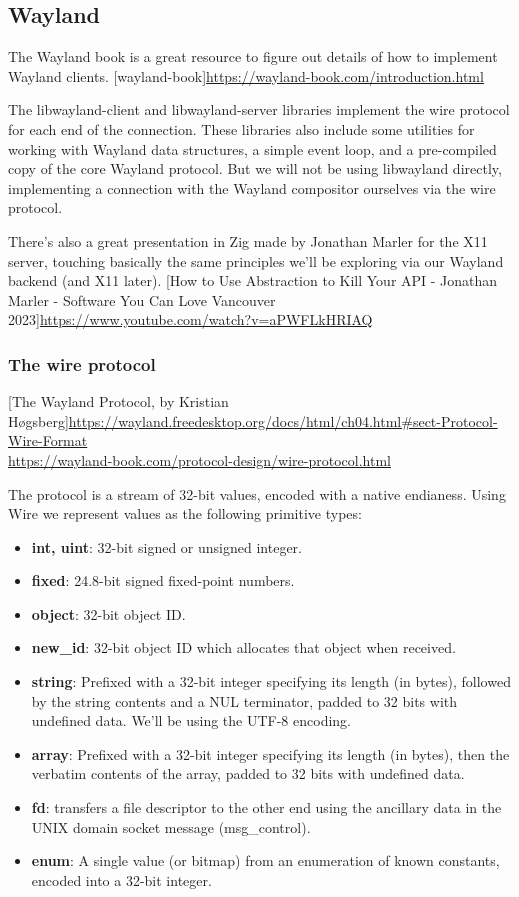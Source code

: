 \subsection{Wayland}
The Wayland book is a great resource to figure out details of how to implement Wayland clients.
[wayland-book]\url{https://wayland-book.com/introduction.html}

The libwayland-client and libwayland-server libraries implement the wire protocol for each end of the connection.
These libraries also include some utilities for working with Wayland data structures, a simple event loop, and a pre-compiled copy of the core Wayland protocol.
But we will not be using libwayland directly, implementing a connection with the Wayland compositor ourselves via the wire protocol.

There's also a great presentation in Zig made by Jonathan Marler for the X11 server, touching basically the same principles we'll be exploring via our Wayland backend (and X11 later).
[How to Use Abstraction to Kill Your API - Jonathan Marler - Software You Can Love Vancouver 2023]\url{https://www.youtube.com/watch?v=aPWFLkHRIAQ}

\subsubsection{The wire protocol}
[The Wayland Protocol, by Kristian Høgsberg]\url{https://wayland.freedesktop.org/docs/html/ch04.html#sect-Protocol-Wire-Format} \\
[The Wayland Protocol, by Drew DeVault]\url{https://wayland-book.com/protocol-design/wire-protocol.html}

The protocol is a stream of 32-bit values, encoded with a native endianess.
Using Wire we represent values as the following primitive types:
\begin{itemize}
    \item \textbf{int, uint}: 32-bit signed or unsigned integer.
    \item \textbf{fixed}: 24.8-bit signed fixed-point numbers.
    \item \textbf{object}: 32-bit object ID.
    \item \textbf{new\_id}: 32-bit object ID which allocates that object when received.
    \item \textbf{string}: Prefixed with a 32-bit integer specifying its length (in bytes),
        followed by the string contents and a NUL terminator, padded to 32 bits with undefined data.
        We'll be using the UTF-8 encoding.
    \item \textbf{array}: Prefixed with a 32-bit integer specifying its length (in bytes),
        then the verbatim contents of the array, padded to 32 bits with undefined data.
    \item \textbf{fd}: transfers a file descriptor to the other end using the ancillary data 
        in the UNIX domain socket message (msg\_control).
    \item \textbf{enum}: A single value (or bitmap) from an enumeration of known constants, encoded into a 32-bit integer.
\end{itemize}

